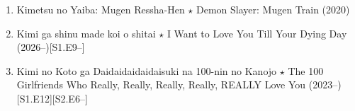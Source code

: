 \documentclass{article}
\begin{document}
\begin{enumerate}
    {\sf Zenitsu Agatsuma.}

    {\sf Nezuko Kamado.}

    {\sf Akaza.}
    \begin{itemize}
    	\item {\it``I hate weak people. Weak people $\ldots$ never fight face to face. \& poison well. Despicable. Weak people $\ldots$ They lack patience. They will quickly reap what they sow. I killed people with these `protecting fists'. I blooded my master's previous Soryuu style. I couldn't respect my father's last words. That's right. That's who I wanted to kill.''} -- {\sf Akaza}, before committing suicide, Chap. 155.
    \end{itemize}
    \item {\sc Kimetsu no Yaiba: Mugen Ressha-Hen $\star$ Demon Slayer: Mugen Train} (2020)
    \item Kimi ga shinu made koi o shitai $\star$ I Want to Love You Till Your Dying Day (2026--)\hfill[S1.E9--]
    \item {\sc Kimi no Koto ga Daidaidaidaidaisuki na 100-nin no Kanojo $\star$ The 100 Girlfriends Who Really, Really, Really, Really, REALLY Love You} (2023--)\hfill[S1.E12][S2.E6--]


\end{enumerate}
\end{document}
